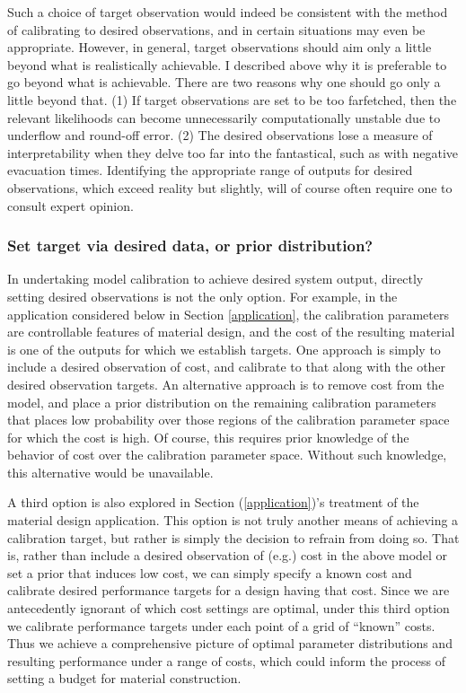 \documentclass{article}
\begin{document}
Such a choice of target observation would indeed be consistent with the method of calibrating to desired observations, and in certain situations may even be appropriate. However, in general, target observations should aim only a little beyond what is realistically achievable. I described above why it is preferable to go beyond what is achievable. There are two reasons why one should go only a little beyond that. (1) If target observations are set to be too farfetched, then the relevant likelihoods can become unnecessarily computationally unstable due to underflow and round-off error. 
(2) The desired observations lose a measure of interpretability when they delve too far into the fantastical, such as with negative evacuation times. Identifying the appropriate range of outputs for desired observations, which exceed reality but slightly, will of course often require one to consult expert opinion. 

\subsubsection{Set target via desired data, or prior distribution?}
In undertaking model calibration to achieve desired system output, directly setting desired observations is not the only option. For example, in the application considered below in Section \ref{application}, the calibration parameters are controllable features of material design, and the cost of the resulting material is one of the outputs for which we establish targets. 
One approach is simply to include a desired observation of cost, and calibrate to that along with the other desired observation targets. 
An alternative approach is to remove cost from the model, and place a prior distribution on the remaining calibration parameters that places low probability over those regions of the calibration parameter space for which the cost is high. Of course, this requires prior knowledge of the behavior of cost over the calibration parameter space. Without such knowledge, this alternative would be unavailable.

A third option is also explored in Section (\ref{application})'s treatment of the material design application. This option is not truly another means of achieving a calibration target, but rather is simply the decision to refrain from doing so. That is, rather than include a desired observation of (e.g.) cost in the above model or set a prior that induces low cost, we can simply specify a known cost and calibrate desired performance targets for a design having that cost. Since we are antecedently ignorant of which cost settings are optimal, under this third option we calibrate performance targets under each point of a grid of ``known'' costs. Thus we achieve a comprehensive picture of optimal parameter distributions and resulting performance under a range of costs, which could inform the process of setting a budget for material construction.
\end{document}
